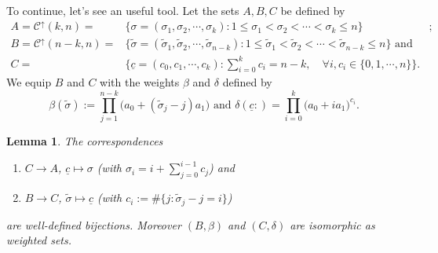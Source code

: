 \documentclass[12pt,a4paper]{article}
\newtheorem{lemma}[theorem]{Lemma}%
\theoremstyle{definition} %
\theoremstyle{remark}
\theoremstyle{examples}
\newcommand{\coss}{\cdots}
\begin{document}
To continue, let's see an useful tool.
Let the sets $A,B,C$ be defined by
\begin{align*}
	A=\mathcal{C}^\uparrow(k,n)=&\{\sigma=(\sigma_1,\sigma_2,\coss,\sigma_{k}): 1\leq \sigma_1<\sigma_2<\coss <\sigma_{k}\leq n\}&;\\
	B=\mathcal{C}^\uparrow(n-k,n)=&\{\tilde{\sigma}=(\tilde{\sigma}_1,\tilde{\sigma}_2,\coss,\tilde{\sigma}_{n-k}): 1\leq \tilde{\sigma}_1<\tilde{\sigma}_2<\coss <\tilde{\sigma}_{n-k}\leq n\} \text{ and }\\
	C=&\{ \underline{c}=(c_0,c_1,\coss,c_{k}): \sum_{i=0}^{k}c_i=n-k, \quad \forall i, c_i\in \{0,1,\coss, n\} \}.
\end{align*}
We equip $B$ and $C$ with the weights $\beta$ and $\delta$ defined by
\begin{equation*}
	\beta(\tilde{\sigma}):=\prod_{j=1}^{n-k} \big(a_0+(\tilde{\sigma}_j-j)a_1\big)
	\text{ and } 
	\delta(\underline{c}:)=\prod_{i=0}^{k} \big(a_0+ia_1\big)^{c_{i}}.
\end{equation*}

\begin{lemma}\label{abc}
	The correspondences 
	\begin{enumerate}[label=(\alph*)]
		\item \label{aaba} $C\to A$, $\underline{c}\mapsto \sigma$ (with $\sigma_i=i+\sum_{j=0}^{i-1}c_j$) and
		\item \label{bbbcb} $B\to C$,  $\tilde{\sigma}\mapsto \underline{c}$ (with $c_i:=\# \{j: \tilde{\sigma}_j-j=i\}$)
	\end{enumerate}
	are well-defined bijections. Moreover $ (B,\beta) $ and $ (C,\delta)$ are isomorphic as weighted sets.
\end{lemma}
\end{document}
